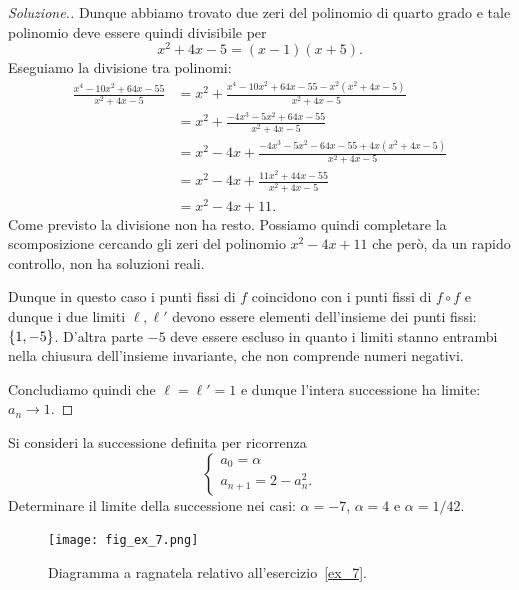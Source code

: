 \begin{proof}[Soluzione.]
Dunque abbiamo trovato due zeri del polinomio di quarto grado e
tale polinomio deve essere quindi divisibile per
\[
 x^2 + 4x - 5 = (x-1)(x+5).
\]
Eseguiamo la divisione tra polinomi:
\begin{align*}
\frac{x^4 - 10 x^2 + 64 x - 55}{x^2 + 4x - 5}
&= x^2 + \frac{x^4 - 10 x^2 + 64x - 55 - x^2 (x^2 + 4x - 5)}{x^2+4x-5}\\
&= x^2 + \frac{-4x^3 - 5 x^2 + 64 x - 55}{x^2+4x-5}\\
&= x^2 - 4x + \frac{-4x^3 - 5x^2 - 64 x - 55 + 4x(x^2+4x-5)}{x^2+4x-5}
\\
&= x^2 - 4x + \frac{11 x^2 + 44 x - 55}{x^2 + 4x -5}\\
&= x^2 - 4x + 11.
\end{align*}
Come previsto la divisione non ha resto. Possiamo quindi completare la
scomposizione cercando gli zeri del polinomio $x^2-4x+11$ che però, da
un rapido controllo, non ha soluzioni reali.

Dunque in questo caso i punti fissi di $f$ coincidono con i punti
fissi di $f\circ f$ e dunque i due limiti $\ell, \ell'$ devono essere
elementi dell'insieme dei punti fissi: ${\left\{ 1, -5 \right\}}$. D'altra parte $-5$
deve essere escluso in quanto i limiti stanno entrambi nella chiusura
dell'insieme invariante, che non comprende numeri negativi.

Concludiamo quindi che $\ell = \ell' = 1$ e dunque l'intera
successione ha limite: $a_n \to 1$.
\end{proof}

\begin{exercise}\label{ex_7}
  Si consideri la successione definita per ricorrenza
  \[
  \begin{cases}
    a_0 = \alpha\\
    a_{n+1} = 2- a_n^2.
  \end{cases}
  \]
  Determinare il limite della successione nei casi: $\alpha=-7$, $\alpha=4$ e $\alpha=1/42$.
\end{exercise}

\begin{figure}
   \begin{center}
    \texttt{[image: fig\_ex\_7.png]}
  \end{center}
  \caption{Diagramma a ragnatela relativo
    all'esercizio~\ref{ex_7}.}
  \label{fig_ex_7}
\end{figure}

